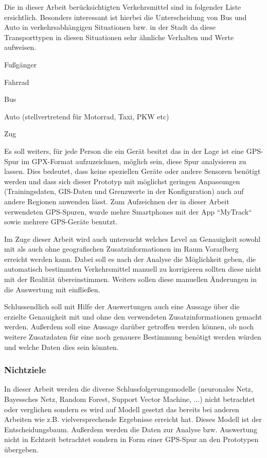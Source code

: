 Die in dieser Arbeit berücksichtigten Verkehrsmittel sind in folgender Liste ersichtlich. Besonders interessant ist hierbei die Unterscheidung von Bus und Auto in verkehrsabhängigen Situationen bzw. in der Stadt da diese Transporttypen in diesen Situationen sehr ähnliche Verhalten und Werte aufweisen. 

\begin{pitemize}
\item Fußgänger
\item Fahrrad
\item Bus
\item Auto (stellvertretend für Motorrad, Taxi, PKW etc)
\item Zug
\end{pitemize}

Es soll weiters, für jede Person die ein Gerät besitzt das in der Lage ist eine GPS-Spur im GPX-Format aufzuzeichnen, möglich sein, diese Spur analysieren zu lassen. Dies bedeutet, dass keine speziellen Geräte oder andere Sensoren benötigt werden und dass sich dieser Prototyp mit möglichst geringen Anpassungen (Trainingsdaten, GIS-Daten und Grenzwerte in der Konfiguration) auch auf andere Regionen anwenden lässt. Zum Aufzeichnen der in dieser Arbeit verwendeten GPS-Spuren, wurde mehre Smartphones mit der App ``MyTrack`` sowie mehrere GPS-Geräte benutzt.

Im Zuge dieser Arbeit wird auch untersucht welches Level an Genauigkeit sowohl mit als auch ohne geografischen Zusatzinformationen im Raum Vorarlberg erreicht werden kann. Dabei soll es nach der Analyse die Möglichkeit geben, die automatisch bestimmten Verkehrsmittel manuell zu korrigieren sollten diese nicht mit der Realität übereinstimmen. Weiters sollen diese manuellen Änderungen in die Auswertung mit einfließen. 

Schlussendlich soll mit Hilfe der Auswertungen auch eine Aussage über die erzielte Genauigkeit mit und ohne den verwendeten Zusatzinformationen gemacht werden. Außerdem soll eine Aussage darüber getroffen werden können, ob noch weitere Zusatzdaten für eine noch genauere Bestimmung benötigt werden würden und welche Daten dies sein könnten. 

\subsubsection{Nichtziele}

In dieser Arbeit werden die diverse Schlussfolgerungsmodelle (neuronales Netz, Bayessches Netz, Random Forest, Support Vector Machine, ...) nicht betrachtet oder verglichen sondern es wird auf Modell gesetzt das bereits bei anderen Arbeiten wie z.B. \cite{stenneth_transportation_2011, reddy_using_2010, sebastian_nagel_moglichkeitsstudie_2011,zheng_learning_2008} vielversprechende Ergebnisse erreicht hat. Dieses Modell ist der Entscheidungsbaum. Außerdem werden die Daten zur Analyse bzw. Auswertung nicht in Echtzeit betrachtet sondern in Form einer GPS-Spur an den Prototypen übergeben.

